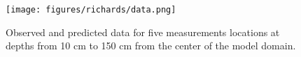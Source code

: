 \begin{figure}[!htbp]
\begin{center}
\texttt{[image: figures/richards/data.png]}
\end{center}
\caption{Observed and predicted data for five measurements locations at depths from 10 cm to 150 cm from the center of the model domain.}
\label{fig:richards-data}
\end{figure}
